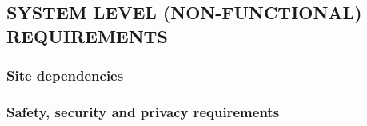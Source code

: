 \documentclass[letterpaper, 10pt, draftclsnofoot, onecolumn]{IEEEtran}
\begin{document}
\subsection[SYSTEM LEVEL (NON{}-FUNCTIONAL)
REQUIREMENTS]{\rmfamily\bfseries\color{black}
SYSTEM LEVEL (NON-FUNCTIONAL) REQUIREMENTS}

\noindent \subsubsection[Site
dependencies]{\rmfamily\bfseries\color{black}
Site dependencies}


\subsubsection[Safety, security and privacy
requirements]{\rmfamily\bfseries\color{black}
Safety, security and privacy requirements}
\end{document}
